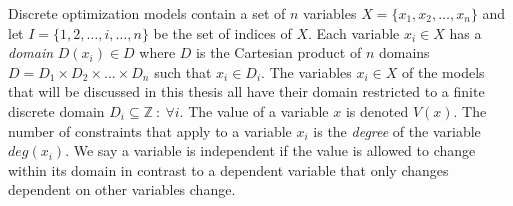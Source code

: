 Discrete optimization models contain a set of $n$ variables $X = \{ x_1, x_2, \dots , x_n \} $ and let $I = 
\{1,2,\dots, i, \dots , n\}$ be 
the set of indices of $X$. Each variable $x_i \in X$ has a \emph{domain} $D(x_i) \in D$ where $D$ is the Cartesian 
product of $n$ domains $D =  D_1 \times D_2 \times \dots\times D_n $ such that $x_i \in D_i$. The variables $x_i \in X$ 
of the models that will be discussed in this thesis all have their domain restricted to a finite discrete domain $D_i 
\subseteq \mathbb{Z}\ : \: \forall i$.  The value of a variable $x$ is denoted $V(x)$. The number of constraints that 
apply to a variable $x_i$ is the \emph{degree} of the variable $deg(x_i)$. We say a variable is 
independent if the value is allowed to change within its domain in contrast to a dependent variable that only changes 
dependent on other variables change. 